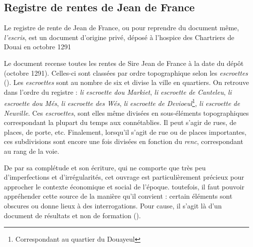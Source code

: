 \subsection{Registre de rentes de Jean de France}
Le registre de rente de Jean de France, ou pour reprendre du document même, \textit{l'escris}, est un document d'origine privé, déposé à l'hospice des Chartriers de Douai en octobre 1291 

Le document recense toutes les rentes de Sire Jean de France à la date du dépôt (octobre 1291). Celles-ci sont classées par ordre topographique selon les \textit{escroettes} (\cite{espinas_les_1933}). Les \textit{escroettes} sont au nombre de six et divise la ville en quartiers. On retrouve dans l'ordre du registre : \textit{li escroette dou Markiet}, \textit{li escroette de Canteleu}, \textit{li escroette dou Més}, \textit{li escroette des Wés}, \textit{li escroette de Devioeul}\footnote{ Correspondant au quartier du Douayeul}, \textit{li escroette de Neuville}.
Ces \textit{escroettes}, sont elles même divisées en sous-éléments topographiques correspondant la plupart du temps aux connétablies. Il peut s'agir de rues, de places, de porte, etc. Finalement, lorsqu'il s'agit de rue  ou de places importantes, ces subdivisions sont encore une fois divisées en fonction du \textit{renc}, correspondant au rang de la voie.

De par sa complétude et son écriture, qui ne comporte que très peu d'imperfections et d'irrégularités, cet ouvrage est particulièrement précieux pour approcher le contexte économique et social de l'époque. 
toutefois, il faut pouvoir appréhender cette source de la manière qu'il convient : certain éléments sont obscures ou donne lieux à des interrogations. Pour cause, il s'agit là d'un document de résultats et non de formation (\cite{espinas_les_1933}).


